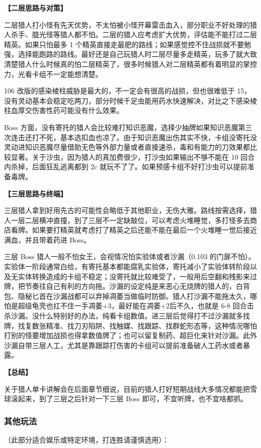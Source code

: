 ﻿\documentclass[12pt, a4paper]{article}
\begin{document}
\textbf{【二层思路与对策】}

二层猎人打小怪有先天优势，不太怕被小怪开幕雷击血入，部分职业不好处理的猎人杀手、胧光怪等猎人都不怕。二层的猎人应考虑扩大优势，评估能不能打过二层精英。如果只怕最多 1 个精英直接走最肥的路线；如果感觉控不住战损就不要勉强，选择能跑路的路线。最好还是自己玩猎人时二层尽量多走精英，玩多了就大致清楚猎人什么时候真的怕二层精英了，很多时候猎人对二层精英都有着明显的掌控力，光看卡组不一定能想清楚。

106 改版的感染棱柱威胁是最大的，不一定会有很高的战损，但也很难低于 15，没有灵动基本会稳定吃两刀，部分时候千足虫能用药水快速解决，对比之下感染棱柱血厚交伤害性药可能没有什么效果。

Boss 方面，没有寄托的猎人会比较难打知识恶魔，选择少抽牌如果知识恶魔第三次连击还打不死，基本选扣血也凉了。由于知识恶魔出伤其实不快，卡组没寄托没灵动进知识恶魔尽量借助无色等外部力量或者直接速杀，毒和有能力的刀效果都比较显著。关于沙虫，因为猎人的真加费很少，打沙虫如果输出不够不能在 10 回合内杀掉，后面狂乱逃离都到 2c 就玩不了了。如果预感卡组不好打沙虫可以提前准备毒牌。

\textbf{【三层思路与终端】}

三层猎人拿到好用先古的可能性会略低于其他职业，无伤大雅。路线按需选择，猎人一层二层横冲直撞，到了三层不一定缺敲位，可以考虑火堆睡觉，多打怪多去商店看牌。如果要打精英就考虑打了精英之后还能不能在最后一个火堆睡一觉后接近满血，并且带着药进 Boss。

三层 Boss 猎人一般不怕女王，会视情况怕实验体或者沙漏（0.103 的门扉不怕）。实验体一阶段通常白给，有寄托基本都能腐乳实验体，寄托减小了实验体转阶段以及无实体转换造成的卡组不稳定；没寄托就比较难受了，一般用后空翻和残影来过牌，把节奏往自己有利的方向拖。沙漏的设定纯是来恶心无烧牌的猎人的，白背包、隐秘匕首在沙漏战都可以弃掉凋萎当做临时防御。猎人打沙漏不能拖太久，哪怕是超级龟壳也扛不住一手凋萎+3，最好能在凋萎+2后不久，也就是 6-8 回合击杀沙漏。没什么特别好的办法，纯看卡组数值。进三层后觉得打不过沙漏就多找牌，找复数张精准、找刀刃陷阱、找触媒、找跟踪、找群蛇形态等，这种情况哪怕打别的怪要增加战损也得拿数值牌了；也可以留复制药、超巨化来针对沙漏。此外沙漏自带三层人工，尤其是靠跟踪打伤害的卡组可以提前准备破人工药水或者暴露。

\textbf{【总结】}

关于猎人单卡讲解会在后面章节细说，目前的猎人打好短期战线大多情况都能把雪球滚起来，到了三层之后针对一下三层 Boss 即可，不宜听牌，也不宜啥都抓。

\subsubsection{其他玩法}
（此部分适合娱乐或特定环境，打连胜请谨慎选用）：
\end{document}
